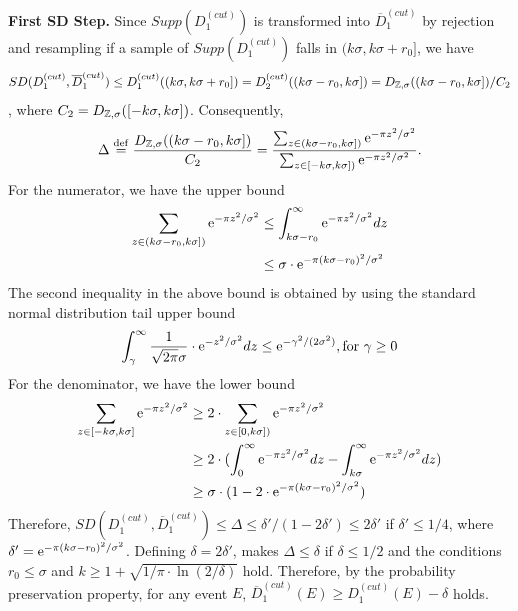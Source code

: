 \begin{sloppypar}
  \textbf{First SD Step.} Since $Supp(D_1^{(cut)})$ is transformed into
  $\overline{D}_1^{(cut)}$ by rejection and resampling if a sample of
  $Supp(D_1^{(cut)})$ falls in $(k\sigma,k\sigma+r_0]$, we have
  $$SD(D_1^{(cut)}, \overline{D}_1^{(cut)}) \leq
  D_1^{(cut)}((k\sigma,k\sigma+r_0]) = D_2^{(cut)}((k\sigma-r_0,k\sigma]) =
  D_{\mathbb{Z},\sigma}((k\sigma-r_0,k\sigma])/C_2$$, where
  $C_2 = D_{\mathbb{Z},\sigma}([-k\sigma,k\sigma])$. Consequently,
$$
\Delta \stackrel{\mathrm{def}}{=} \frac{D_{\mathbb{Z},\sigma}((k\sigma-r_0,k\sigma])}{C_2} = \frac{\sum_{z
    \in (k\sigma-r_0,k\sigma])} \mathrm{e}^{-\pi z^2/\sigma^2}}{\sum_{z \in
    [-k\sigma,k\sigma])} \mathrm{e}^{-\pi z^2/\sigma^2}}.
$$
For the numerator, we have the upper bound
\begin{align*}
  \sum_{z \in (k\sigma-r_0,k\sigma])} \mathrm{e}^{-\pi z^2/\sigma^2}
  &\leq \int^{\infty}_{k\sigma-r_0} \mathrm{e}^{-\pi z^2/\sigma^2} dz\\
  &\leq \sigma \cdot \mathrm{e}^{-\pi
    (k\sigma-r_0)^2/\sigma^2}
\end{align*}
The second inequality in the above bound is obtained by using the standard normal distribution tail upper bound
$$\int^{\infty}_{\gamma} \frac{1}{\sqrt{2\pi} \sigma} \cdot \mathrm{e}^{- z^2/\sigma^2}
dz \leq \mathrm{e}^{-\gamma^2/(2\sigma^2)}, \text{for }\gamma \geq 0 $$
For the denominator, we have the lower bound
\begin{align*}
  \sum_{z \in [-k\sigma,k\sigma]} \mathrm{e}^{-\pi z^2/\sigma^2}
  &\geq 2 \cdot \sum_{z \in [0,k\sigma])} \mathrm{e}^{-\pi z^2/\sigma^2}\\
  &\geq 2 \cdot (\int^{\infty}_{0} \mathrm{e}^{-\pi
    z^2/\sigma^2} dz - \int^{\infty}_{k\sigma} \mathrm{e}^{-\pi z^2/\sigma^2} dz)\\
  &\geq \sigma \cdot (1 - 2 \cdot \mathrm{e}^{-\pi (k\sigma-r_0)^2/\sigma^2})
\end{align*}
Therefore,
$SD(D_1^{(cut)}, \overline{D}_1^{(cut)}) \leq \Delta \leq \delta' / (1-2\delta')
\leq 2\delta'$ if $\delta' \leq 1/4$, where
$\delta' = \mathrm{e}^{-\pi (k\sigma-r_0)^2/\sigma^2}$. Defining $\delta = 2\delta'$, makes $\Delta \leq \delta$ if $\delta \leq 1/2$ and the conditions
$r_0 \leq \sigma$ and $k \geq 1 + \sqrt{1/\pi \cdot \ln(2/\delta)}$
hold. Therefore, by the probability preservation property, for any event $E$, 
$\overline{D}_1^{(cut)}(E) \geq D_1^{(cut)}(E) - \delta$ holds.
\end{sloppypar}

